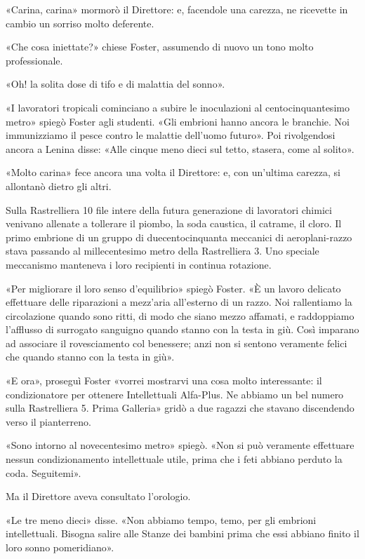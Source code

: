 \documentclass[
a5paper, %
10pt, %
twoside, 
onecolumn, %
openany, %
]{memoir}
\begin{document}
«Carina, carina» mormorò il Direttore: e, facendole una carezza, ne ricevette in cambio un sorriso molto deferente.

«Che cosa iniettate?» chiese Foster, assumendo di nuovo un tono molto professionale.

«Oh! la solita dose di tifo e di malattia del sonno».

«I lavoratori tropicali cominciano a subire le inoculazioni al centocinquantesimo metro» spiegò Foster agli studenti. «Gli embrioni hanno ancora le branchie. Noi immunizziamo il pesce contro le malattie dell’uomo futuro». Poi rivolgendosi ancora a Lenina disse: «Alle cinque meno dieci sul tetto, stasera, come al solito».

«Molto carina» fece ancora una volta il Direttore: e, con un’ultima carezza, si allontanò dietro gli altri.

Sulla Rastrelliera 10 file intere della futura generazione di lavoratori chimici venivano allenate a tollerare il piombo, la soda caustica, il catrame, il cloro. Il primo embrione di un gruppo di duecentocinquanta meccanici di aeroplani-razzo stava passando al millecentesimo metro della Rastrelliera 3. Uno speciale meccanismo manteneva i loro recipienti in continua rotazione.

«Per migliorare il loro senso d’equilibrio» spiegò Foster. «È un lavoro delicato effettuare delle riparazioni a mezz’aria all’esterno di un razzo. Noi rallentiamo la circolazione quando sono ritti, di modo che siano mezzo affamati, e raddoppiamo l’afflusso di surrogato sanguigno quando stanno con la testa in giù. Così imparano ad associare il rovesciamento col benessere; anzi non si sentono veramente felici che quando stanno con la testa in giù».

«E ora», proseguì Foster «vorrei mostrarvi una cosa molto interessante: il condizionatore per ottenere Intellettuali Alfa-Plus. Ne abbiamo un bel numero sulla Rastrelliera 5. Prima Galleria» gridò a due ragazzi che stavano discendendo verso il pianterreno.

«Sono intorno al novecentesimo metro» spiegò. «Non si può veramente effettuare nessun condizionamento intellettuale utile, prima che i feti abbiano perduto la coda. Seguitemi».

Ma il Direttore aveva consultato l’orologio.

«Le tre meno dieci» disse. «Non abbiamo tempo, temo, per gli embrioni intellettuali. Bisogna salire alle Stanze dei bambini prima che essi abbiano finito il loro sonno pomeridiano».
\end{document}
